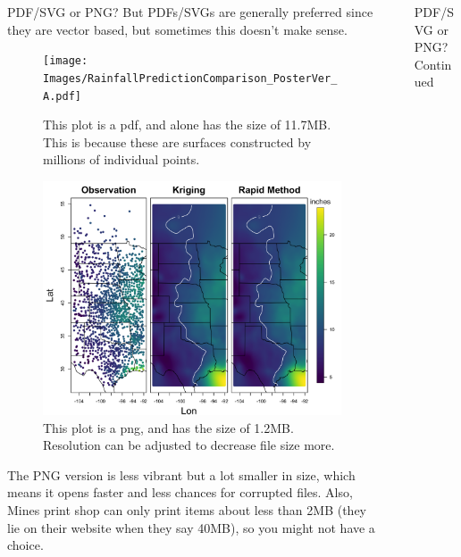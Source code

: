 \documentclass[final]{beamer}
\newlength{\sepwidth}
\newlength{\colwidth}
\newcommand{\separatorcolumn}{\begin{column}{\sepwidth}\end{column}}
\begin{document}
\begin{frame}[t]
\begin{columns}[t]
\begin{column}{\colwidth}
\begin{block}{PDF/SVG or PNG?}
But PDFs/SVGs are generally preferred since they are vector based, but sometimes this doesn't make sense. 
\begin{figure}[h]
	\centering
	\texttt{[image: Images/RainfallPredictionComparison\_PosterVer\_A.pdf]}
	\caption{This plot is a pdf, and alone has the size of 11.7MB. This is because these are surfaces constructed by millions of individual points. }
	\label{fig:RainfallPDF}
\end{figure} 

\vspace{-1cm}

\begin{figure}[h]
	\centering
	\includegraphics[width=0.75\linewidth]{Images/RainfallPredictionComparison_PosterVer_A.png}
	\caption{This plot is a png, and has the size of 1.2MB. Resolution can be adjusted to decrease file size more. }
	\label{fig:RainfalPNG}
\end{figure} 

\vspace{-1cm}

The PNG version is less vibrant but a lot smaller in size, which means it opens faster and less chances for corrupted files. Also, Mines print shop can only print items about less than 2MB (they lie on their website when they say 40MB), so you might not have a choice. 
\end{block}

\end{column}


\separatorcolumn
\begin{column}{\colwidth}

\begin{block}{PDF/SVG or PNG? Continued}


\end{block}
\end{column}
\end{columns}
\end{frame}
\end{document}
